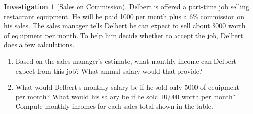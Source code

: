 \documentclass[10pt,]{book}
\theoremstyle{plain}
\theoremstyle{definition}
\theoremstyle{definition}
\theoremstyle{definition}
\newtheorem{investigation}[project]{Investigation}
\theoremstyle{definition}
\numberwithin{equation}{section}
\newcommand{\hrulethin}  {\noalign{\hrule height 0.04em}}
\newcommand{\hrulethick} {\noalign{\hrule height 0.11em}}
\newcounter{figstack}
\newlength\fight
\newcommand\pushValignCaptionBottom[5][b]{%
\stepcounter{figstack}%
\expandafter\def\csname %
figalign\romannumeral\value{figstack}\endcsname{#1}%
\expandafter\def\csname %
figtype\romannumeral\value{figstack}\endcsname{#2}%
\expandafter\def\csname %
figwd\romannumeral\value{figstack}\endcsname{#3}%
\expandafter\def\csname %
figcontent\romannumeral\value{figstack}\endcsname{#4}%
\expandafter\def\csname %
figcap\romannumeral\value{figstack}\endcsname{#5}%
\setbox0=\hbox{%
\begin{#2}{#3}#4\end{#2}}%
\ifdim\dimexpr\ht0+\dp0\relax>\fight\global\setlength{\fight}{%
\dimexpr\ht0+\dp0\relax}\fi%
}
\begin{document}
\begin{investigation}[Sales on Commission]\label{investigation-1}
Delbert is offered a part-time job selling restaurant equipment. He will be paid \textdollar{}1000 per month plus a 6\% commission on his sales. The sales manager tells Delbert he can expect to sell about \textdollar{}8000 worth of equipment per month. To help him decide whether to accept the job, Delbert does a few calculations.%
\par

                \leavevmode%
\begin{enumerate}
\item\hypertarget{li-1}{}Based on the sales manager’s estimate, what monthly income can Delbert expect from this job? What annual salary would that provide?%
\item\hypertarget{li-2}{}What would Delbert’s monthly salary be if he sold only \textdollar{}5000 of equipment per month? What would his salary be if he sold \textdollar{}10,000 worth per month? Compute monthly incomes for each sales total shown in the table.%
\leavevmode%
\end{enumerate}
\end{investigation}
\end{document}
